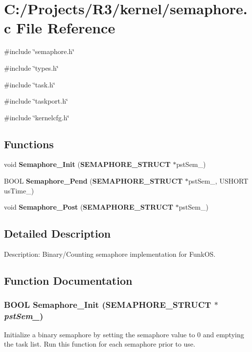 \section{C:/Projects/R3/kernel/semaphore.c File Reference}
\label{semaphore_8c}
{\ttfamily \#include \char`\"{}semaphore.h\char`\"{}}\par
{\ttfamily \#include \char`\"{}types.h\char`\"{}}\par
{\ttfamily \#include \char`\"{}task.h\char`\"{}}\par
{\ttfamily \#include \char`\"{}taskport.h\char`\"{}}\par
{\ttfamily \#include \char`\"{}kernelcfg.h\char`\"{}}\par
\subsection*{Functions}
\begin{DoxyCompactItemize}
\item 
void {\bf Semaphore\_\-Init} ({\bf SEMAPHORE\_\-STRUCT} $\ast$pstSem\_\-)
\item 
BOOL {\bf Semaphore\_\-Pend} ({\bf SEMAPHORE\_\-STRUCT} $\ast$pstSem\_\-, USHORT usTime\_\-)
\item 
void {\bf Semaphore\_\-Post} ({\bf SEMAPHORE\_\-STRUCT} $\ast$pstSem\_\-)
\end{DoxyCompactItemize}


\subsection{Detailed Description}
Description: Binary/Counting semaphore implementation for FunkOS. 

\subsection{Function Documentation}
\subsubsection[{Semaphore\_\-Init}]{\setlength{\rightskip}{0pt plus 5cm}BOOL Semaphore\_\-Init ({\bf SEMAPHORE\_\-STRUCT} $\ast$ {\em pstSem\_\-})}\label{semaphore_8c_ac0dd28af6a43eb9c43d4f80041f861c4}
Initialize a binary semaphore by setting the semaphore value to 0 and emptying the task list. Run this function for each semaphore prior to use.


